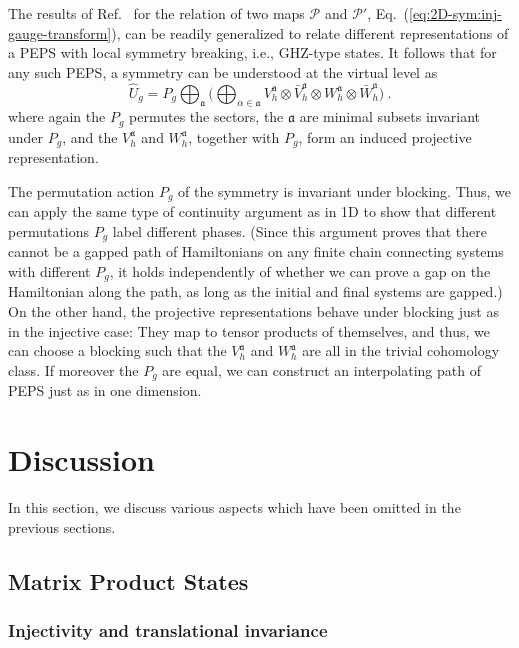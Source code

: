 \documentclass[twocolumn,superscriptaddress,prb,linenumbers]{revtex4-1}
\newcommand{\mc}[1]{\mathcal{#1}}
\newcommand{\mf}[1]{\mathfrak{#1}}
\begin{document}
The results of Ref.~ for the
relation of two maps $\mc P$ and $\mc P'$,
Eq.~(\ref{eq:2D-sym:inj-gauge-transform}), can be readily generalized to
relate different representations of a PEPS with local symmetry breaking,
i.e., GHZ-type states.  It follows that for any such PEPS, a symmetry can
be understood at the virtual level as
\[
    \hat U_g =
    P_g
    \bigoplus_{\mathfrak a}
    \Big(\bigoplus_{\alpha\in \mathfrak a}
    V_h^{\mathfrak a}\otimes \bar V_h^{\mathfrak a}\otimes
    W_h^{\mathfrak a}\otimes \bar W_h^{\mathfrak a}\Big)\ .
\]
where again the $P_g$ permutes the sectors, the $\mf a$ are minimal
subsets invariant under $P_g$, and the $V_h^{\mf a}$ and $W_h^{\mf a}$,
together with $P_g$, form an induced projective representation.

The permutation action $P_g$ of the symmetry is invariant under blocking.
Thus, we can apply the same type of continuity argument as in 1D to show
that different permutations $P_g$ label different phases. (Since this
argument proves that there cannot be a gapped path of Hamiltonians on any
finite chain connecting systems with different $P_g$, it holds
independently of whether we can prove a gap on the Hamiltonian along the
path, as long as the initial and final systems are gapped.)  On the
other hand, the projective representations behave under blocking just as
in the injective case: They map to tensor products of themselves, and
thus, we can choose a blocking such that the $V_h^{\mf a}$ and $W_h^{\mf
            a}$ are all in the trivial cohomology class. If moreover the $P_g$ are
equal, we can construct an interpolating path of PEPS just as in one
dimension.



\section{Discussion
  \label{sec:discussion}}



In this section, we discuss various aspects which have been omitted in the
previous sections.


\subsection{Matrix Product States}

\subsubsection{Injectivity and translational invariance}
\end{document}
